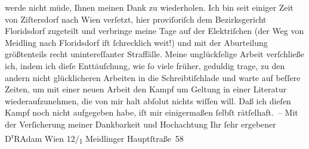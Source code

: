 \begin{ledgroupsized}[t]{13cm}
               werde nicht müde, Ihnen meinen Dank zu wiederholen.\pend
           \pstart
           Ich bin seit einiger Zeit von Ziſtersdorf nach Wien verſetzt, hier proviſoriſch dem Bezirksgericht Floridsdorf zugeteilt und verbringe meine Tage auf
               der Elektriſchen (der Weg von Meidling nach Floridsdorf iſt ſchrecklich weit!) und mit der
               Aburteilung größtenteils recht unintereſſanter Straffälle.\pend
           \pstart
           Meine unglückſelige Arbeit verſchließe ich, indem ich dieſe Enttäuſchung, wie ſo
               viele früher, geduldig trage, zu den andern nicht glücklicheren Arbeiten in die
               Schreibtiſchlade und warte auf beſſere Zeiten, um mit einer neuen Arbeit den Kampf um
               Geltung in einer Literatur wiederaufzunehmen, die von mir halt abſolut nichts wiſſen
               will. Daß ich die{\pb}ſen Kampf noch nicht aufgegeben
               habe, iſt mir einigermaßen ſelbſt rätſelhaft. –\pend
           \pstart
           Mit der Verſicherung meiner Dankbarkeit und Hochachtung Ihr ſehr ergebener\pend
           \pstart \spacefill\mbox{D\textsuperscript{r}RAdam}\pend{}\pstart
           \noindent{}Wien 12/\textsubscript{1} Meidlinger
                     Hauptſtraße 58\pend
           
         
         \endnumbering{}\end{ledgroupsized}  \newcommand{\dateiname}{L02219}\newcommand{\titel}{Robert Adam an Arthur Schnitzler, 26. 9. 1915}\newcommand{\editorInnen}{Martin Anton Müller und Gerd-Hermann Susen}
      